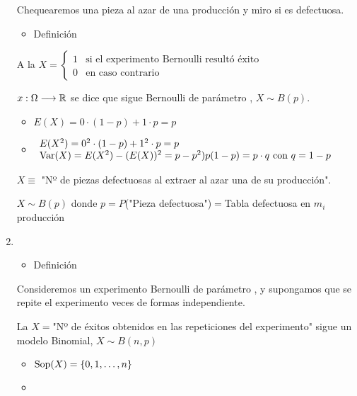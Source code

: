\begin{enumerate}[label=\color{red}\textbf{\Alph*)}, leftmargin=*]
	Chequearemos una pieza al azar de una producción y miro si es defectuosa.
	\begin{itemize}[label=\color{red}\textbullet, leftmargin=*]
		\item \color{lightblue}Definición
	\end{itemize}
	A la \va $X=\begin{cases}
		1 & \text{si el experimento Bernoulli resultó éxito}\\
		0 & \text{en caso contrario}
	\end{cases}$
	
	$x:\Omega\longrightarrow\operatorname{\mathbb{R}}$ se dice que sigue Bernoulli de parámetro , $X\sim B(p)$.
	\begin{itemize}[label=\color{red}$-$]
		\item {}
		
		$E(X)=0\cdot(1-p)+1\cdot p=p$
		\item {}
		
		$\begin{array}{l}
			E(X^2)=0^2\cdot(1-p)+1^2\cdot p=p\\
			\operatorname{Var}(X)=E(X^2)-(E(X))^2=p-p^2)p(1-p)=p\cdot q\text{ con }q=1-p
		\end{array}$
	\end{itemize}
	\Ej
	
	$X\equiv$ "Nº de piezas defectuosas al extraer al azar una de su producción".
	
	$X\sim B(p)$ donde $p=P$("Pieza defectuosa")$=$Tabla defectuosa en $m_i$ producción
	\item {}
	\begin{itemize}[label=\color{red}\textbullet, leftmargin=*]
		\item \color{lightblue}Definición
	\end{itemize}
	Consideremos un experimento Bernoulli de parámetro , y supongamos que se repite el experimento  veces de formas independiente.
	
	La \va $X=$"Nº de éxitos obtenidos en las  repeticiones del experimento" sigue un modelo Binomial, $X\sim B(n,p)$
	\begin{itemize}[label=\color{red}$-$, leftmargin=*]
		\item {}
		
		$\operatorname{Sop}(X)=\{0,1,\dots,n\}$
		\item {}
		

\end{itemize}
\end{enumerate}

